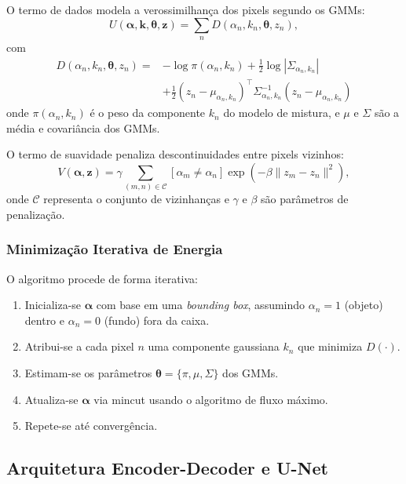 \documentclass[journal]{IEEEtran}
\begin{document}
O termo de dados modela a verossimilhança dos pixels segundo os GMMs:
\begin{equation}
U(\boldsymbol{\alpha}, \mathbf{k}, \boldsymbol{\theta}, \mathbf{z}) = \sum_{n} D(\alpha_n, k_n, \boldsymbol{\theta}, z_n),
\end{equation}
com
\begin{align}
D(\alpha_n, k_n, \boldsymbol{\theta}, z_n) 
= & -\log \pi(\alpha_n, k_n) 
+ \frac{1}{2} \log |\Sigma_{\alpha_n, k_n}| \nonumber \\
& + \frac{1}{2} (z_n - \mu_{\alpha_n, k_n})^\top 
\Sigma_{\alpha_n, k_n}^{-1} (z_n - \mu_{\alpha_n, k_n})
\end{align}
onde $\pi(\alpha_n, k_n)$ é o peso da componente $k_n$ do modelo de mistura, e $\mu$ e $\Sigma$ são a média e covariância dos GMMs.

O termo de suavidade penaliza descontinuidades entre pixels vizinhos:
\begin{equation}
V(\boldsymbol{\alpha}, \mathbf{z}) = \gamma \sum_{(m,n) \in \mathcal{C}} [\alpha_m \neq \alpha_n] \exp\left( -\beta \| z_m - z_n \|^2 \right),
\end{equation}
onde $\mathcal{C}$ representa o conjunto de vizinhanças e $\gamma$ e $\beta$ são parâmetros de penalização.

\subsubsection{Minimização Iterativa de Energia}

O algoritmo procede de forma iterativa:
\begin{enumerate}
    \item Inicializa-se $\boldsymbol{\alpha}$ com base em uma \textit{bounding box}, assumindo $\alpha_n = 1$ (objeto) dentro e $\alpha_n = 0$ (fundo) fora da caixa.
    \item Atribui-se a cada pixel $n$ uma componente gaussiana $k_n$ que minimiza $D(\cdot)$.
    \item Estimam-se os parâmetros $\boldsymbol{\theta} = \{ \pi, \mu, \Sigma \}$ dos GMMs.
    \item Atualiza-se $\boldsymbol{\alpha}$ via mincut usando o algoritmo de fluxo máximo.
    \item Repete-se até convergência.
\end{enumerate}

\subsection{Arquitetura Encoder-Decoder e U-Net}
\end{document}
